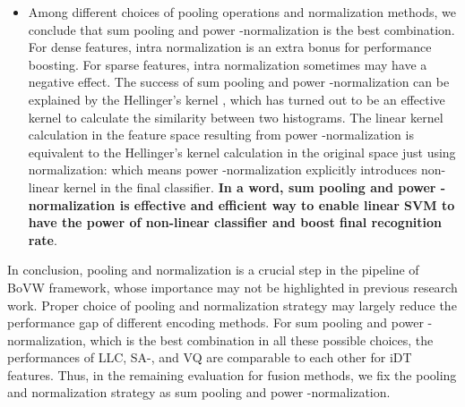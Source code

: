\documentclass[twocolumn]{svjour3}          \smartqed  \usepackage{slashbox}
\begin{document}
\begin{itemize}
  \item Among different choices of pooling operations and normalization methods, we conclude that sum pooling and power -normalization is the best combination. For dense features, intra normalization is an extra bonus for performance boosting. For sparse features, intra normalization sometimes may have a negative effect. The success of sum pooling and power -normalization can be explained by the Hellinger's kernel \cite{VedaldiZ12}, which has turned out to be an effective kernel to calculate the similarity between two histograms. The linear kernel calculation in the feature space resulting from power -normalization is equivalent to the Hellinger's kernel calculation in the original space just using  normalization:
      which means power -normalization explicitly introduces non-linear kernel in the final classifier. \textbf{In a word, sum pooling and power -normalization is effective and efficient way to enable linear SVM to have the power of non-linear classifier and boost final recognition rate}.
\end{itemize}

In conclusion, pooling and normalization is a crucial step in the pipeline of BoVW framework, whose importance may not be highlighted in previous research work. Proper choice of pooling and normalization strategy may largely reduce the performance gap of different encoding methods. For sum pooling and power -normalization, which is the best combination in all these possible choices, the performances of LLC, SA-, and VQ are comparable to each other for iDT features. Thus, in the remaining evaluation for fusion methods, we fix the pooling and normalization strategy as sum pooling and power -normalization.
\end{document}
